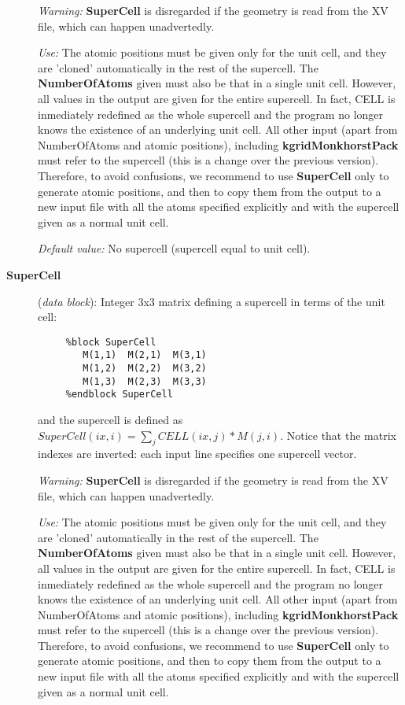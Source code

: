 \documentclass[11pt]{article}
\begin{document}
\begin{description}
{\it Warning:} {\bf SuperCell} is disregarded if the geometry is read from
the XV file, which can happen unadvertedly.

{\it Use:} The atomic positions must be given only for the unit cell,
and they are 'cloned' automatically in the rest of the supercell.
The {\bf NumberOfAtoms} given must also be that in a single unit cell.
However, all values in the output are given for the entire supercell. 
In fact, CELL is inmediately redefined as the whole supercell and the 
program no longer knows the existence of an underlying unit cell.
All other input (apart from NumberOfAtoms and atomic positions), 
including {\bf kgridMonkhorstPack} must refer to the supercell 
(this is a change over the previous version). Therefore, to avoid
confusions, we recommend to use {\bf SuperCell} only to
generate atomic positions, and then to copy them from the output
to a new input file with all the atoms specified explicitly and
with the supercell given as a normal unit cell.

{\it Default value:} No supercell (supercell equal to unit cell).


\item[{\bf SuperCell}] ({\it data block}): 
Integer 3x3 matrix defining a supercell in terms of the unit cell: 

\begin{verbatim}
     %block SuperCell
        M(1,1)  M(2,1)  M(3,1) 
        M(1,2)  M(2,2)  M(3,2) 
        M(1,3)  M(2,3)  M(3,3) 
     %endblock SuperCell
\end{verbatim}

and the supercell is defined as
$SuperCell(ix,i) = \sum_j CELL(ix,j)*M(j,i)$.
Notice that the matrix indexes are inverted: each input line 
specifies one supercell vector.

{\it Warning:} {\bf SuperCell} is disregarded if the geometry is read from
the XV file, which can happen unadvertedly.

{\it Use:} The atomic positions must be given only for the unit cell,
and they are 'cloned' automatically in the rest of the supercell.
The {\bf NumberOfAtoms} given must also be that in a single unit cell.
However, all values in the output are given for the entire supercell. 
In fact, CELL is inmediately redefined as the whole supercell and the 
program no longer knows the existence of an underlying unit cell.
All other input (apart from NumberOfAtoms and atomic positions), 
including {\bf kgridMonkhorstPack} must refer to the supercell 
(this is a change over the previous version). Therefore, to avoid
confusions, we recommend to use {\bf SuperCell} only to
generate atomic positions, and then to copy them from the output
to a new input file with all the atoms specified explicitly and
with the supercell given as a normal unit cell.


\end{description}
\end{document}
